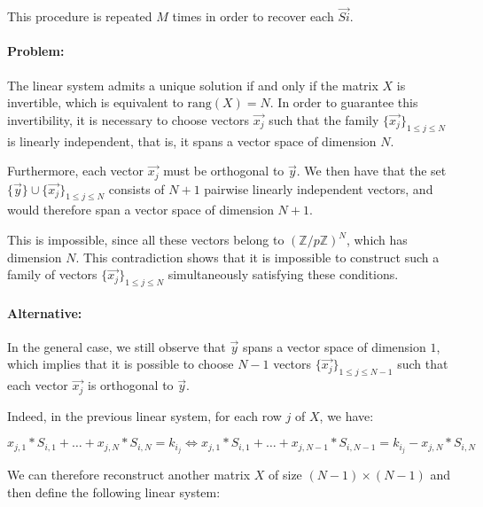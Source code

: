 \documentclass[9pt]{extarticle}
\begin{document}
This procedure is repeated $M$ times in order to recover each $\vec{Si}$.

\paragraph{Problem:}

The linear system admits a unique solution if and only if the matrix $X$ is invertible, which is equivalent to $\mathrm{rang}(X) = N$. 
In order to guarantee this invertibility, it is necessary to choose vectors $\vec{x_j}$ such that the family $\{\vec{x_j}\}_{1 \leq j \leq N}$ is linearly independent, 
that is, it spans a vector space of dimension $N$.

Furthermore, each vector $\vec{x_j}$ must be orthogonal to $\vec{y}$. 
We then have that the set $\{\vec{y}\} \cup \{\vec{x_j}\}_{1 \leq j \leq N}$ consists of $N+1$ pairwise linearly independent vectors, 
and would therefore span a vector space of dimension $N+1$.

This is impossible, since all these vectors belong to $(\mathbb{Z}/p\mathbb{Z})^N$, which has dimension $N$. This contradiction shows that it is impossible to construct such a family of vectors $\{\vec{x_j}\}_{1 \leq j \leq N}$ simultaneously satisfying these conditions.

\paragraph{Alternative:}

In the general case, we still observe that $\vec{y}$ spans a vector space of dimension $1$, which implies that it is possible to choose $N-1$ vectors $\{\vec{x_j}\}_{1 \leq j \leq N-1}$ such that each vector $\vec{x_j}$ is orthogonal to $\vec{y}$.

Indeed, in the previous linear system, for each row $j$ of $X$, we have:

\[ x_{j,1}*S_{i,1} + \ldots + x_{j,N}*S_{i,N} = k_{i_j} \Leftrightarrow x_{j,1}*S_{i,1} + \ldots + x_{j,N-1}*S_{i,N-1} = k_{i_j} - x_{j,N}*S_{i,N} \]

We can therefore reconstruct another matrix $X$ of size $(N-1) \times (N-1)$ and then define the following linear system:
\end{document}

